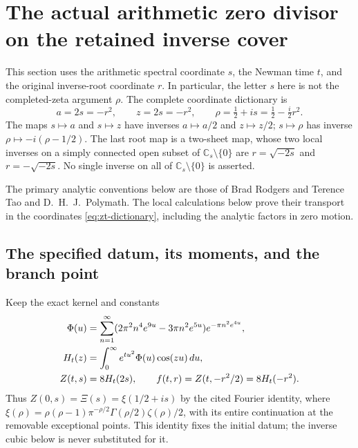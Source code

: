 \section{The actual arithmetic zero divisor on the retained inverse cover}
\label{sec:zt-zero-transport}

This section uses the arithmetic spectral coordinate $s$, the Newman time
$t$, and the original inverse-root coordinate $r$.  In particular, the
letter $s$ here is not the completed-zeta argument $\rho$.  The complete
coordinate dictionary is
\begin{equation}
 a=2s=-r^2,\qquad z=2s=-r^2,\qquad
 \rho=\tfrac12+is=\tfrac12-\tfrac i2r^2.
 \label{eq:zt-dictionary}
\end{equation}
The maps $s\mapsto a$ and $s\mapsto z$ have inverses $a\mapsto a/2$
and $z\mapsto z/2$; $s\mapsto\rho$ has inverse
$\rho\mapsto-i(\rho-1/2)$.  The last root map is a two-sheet map,
whose two local inverses on a simply connected open subset of
$\mathbb C_s\setminus\{0\}$ are $r=\sqrt{-2s}$ and
$r=-\sqrt{-2s}$.  No single inverse on all of $\mathbb C_s\setminus\{0\}$
is asserted.

The primary analytic conventions below are those of Brad Rodgers and
Terence Tao\cite[Section 1, equations (1)--(4)]{rodgersTao2020} and
D.~H.~J.~Polymath\cite[Section 3, Proposition 3.1]{polymath2019}.
The local calculations below prove their transport in the coordinates
\eqref{eq:zt-dictionary}, including the analytic factors in zero motion.

\subsection{The specified datum, its moments, and the branch point}

Keep the exact kernel and constants
\begin{align}
 \Phi(u)&=\sum_{n=1}^{\infty}
 (2\pi^2 n^4 e^{9u}-3\pi n^2e^{5u})e^{-\pi n^2e^{4u}},\notag\\
 H_t(z)&=\int_0^\infty e^{tu^2}\Phi(u)\cos(zu)\,du,\notag\\
 Z(t,s)&=8H_t(2s),\qquad
 f(t,r)=Z(t,-r^2/2)=8H_t(-r^2).
 \label{eq:zt-datum}
\end{align}
Thus $Z(0,s)=\Xi(s)=\xi(1/2+is)$ by the cited Fourier identity,
where $\xi(\rho)=\rho(\rho-1)\pi^{-\rho/2}
\Gamma(\rho/2)\zeta(\rho)/2$, with its entire continuation at the
removable exceptional points.  This identity fixes the initial datum;
the inverse cubic below is never substituted for it.

